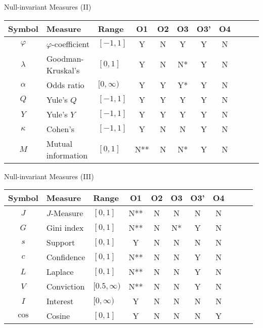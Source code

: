 \begin{frame}{Null-invariant Measures (II)}
	\centering
	\begin{tabular}{|c|l|l|c|c|c|c|c|c|c|c|}
		\hline
		\textbf{Symbol} & \textbf{Measure} & \textbf{Range} & 
		\textbf{O1} & \textbf{O2} & \textbf{O3} & \textbf{O3'} & 
		\textbf{O4} \\\hline
		$\varphi$ & $\varphi$-coefficient & $[-1,1]$       & Y   & N & Y  & 
		Y 
		&   
		N \\
		$\lambda$ & Goodman-Kruskal's     & $[0,1]$        & Y   & N & N* & 
		Y & 
		N \\
		$\alpha$  & Odds ratio            & $[0,\infty)$   & Y   & Y & Y* & 
		Y & 
		N \\
		$Q$       & Yule's $Q$            & $[-1,1]$       & Y   & Y & Y  & 
		Y & 
		N \\
		$Y$       & Yule's $Y$            & $[-1,1]$       & Y   & Y & Y  & 
		Y & 
		N \\
		$\kappa$  & Cohen's               & $[-1,1]$       & Y   & N & N  & 
		Y & 
		N \\
		$M$       & Mutual information    & $[0,1]$        & N** & N & N* & 
		Y & 
		N \\\hline
	\end{tabular}
\end{frame}

\begin{frame}{Null-invariant Measures (III)}
	\centering
	\begin{tabular}{|c|l|l|c|c|c|c|c|c|c|c|}
		\hline
		\textbf{Symbol} & \textbf{Measure} & \textbf{Range} & 
		\textbf{O1} & \textbf{O2} & \textbf{O3} & \textbf{O3'} & 
		\textbf{O4} \\\hline
		$J$       & $J$-Measure           & $[0,1]$        & N** & N & N  & 
		N & 
		N \\
		$G$       & Gini index            & $[0,1]$        & N** & N & N* & 
		Y & 
		N \\
		$s$       & Support               & $[0,1]$        & Y   & N & N  & 
		N & 
		N \\
		{\color{red}$c$} & {\color{red}Confidence} & 
		{\color{red}$[0,1]$} & {\color{red}N**} & {\color{red}N} & 
		{\color{red}N} & {\color{red}Y} & {\color{red}N} \\
		$L$       & Laplace               & $[0,1]$        & N** & N & N  & 
		Y & 
		N \\
		$V$       & Conviction            & $[0.5,\infty)$ & N** & N & N  & 
		Y & 
		N \\
		$I$       & Interest              & $[0,\infty)$   & Y   & N & N  & 
		N & 
		N \\
		{\color{red}$\cos$} & {\color{red}Cosine} & 
		{\color{red}$[0,1]$} & {\color{red}Y} & {\color{red}N} & 
		{\color{red}N} & {\color{red}N} & {\color{red}Y} \\\hline
	\end{tabular}
\end{frame}

